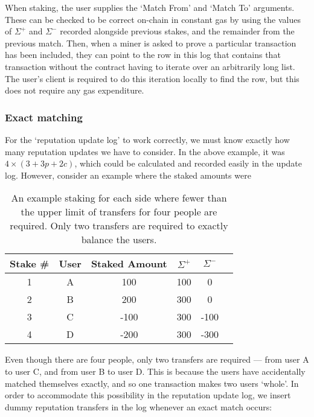 When staking, the user supplies the `Match From' and `Match To' arguments. These can be checked to be correct on-chain in constant gas by using the values of $\Sigma^+$ and $\Sigma^-$ recorded alongside previous stakes, and the remainder from the previous match. Then, when a miner is asked to prove a particular transaction has been included, they can point to the row in this log that contains that transaction without the contract having to iterate over an arbitrarily long list. The user's client is required to do this iteration locally to find the row, but this does not require any gas expenditure.

\subsubsection{Exact matching}\label{sec:exactMatching}

For the `reputation update log' to work correctly, we must know exactly how many reputation updates we have to consider. In the above example, it was $4\times(3+3p+2c)$, which could be calculated and recorded easily in the update log. However, consider an example where the staked amounts were

\begin{table}[ht]
\centering
\caption{An example staking for each side where fewer than the upper limit of transfers for four people are required. Only two transfers are required to exactly balance the users.}
\begin{tabular}{|c|c|c|c|c|c|}
\hline
Stake \# & User  & Staked Amount & $\Sigma^+$ & $\Sigma^-$ \\ \hline
1 & A & 100           & 100                      & 0                                                                       \\ \hline
2 & B & 200           & 300                      & 0                                                                       \\ \hline
3 & C & -100           & 300                      & -100                                                                       \\ \hline
4 & D & -200          & 300                      & -300                                                                    \\ \hline
\end{tabular}
\end{table}

Even though there are four people, only two transfers are required --- from user A to user C, and from user B to user D. This is because the users have accidentally matched themselves exactly, and so one transaction makes two users `whole'. In order to accommodate this possibility in the reputation update log, we insert dummy reputation transfers in the log whenever an exact match occurs:

